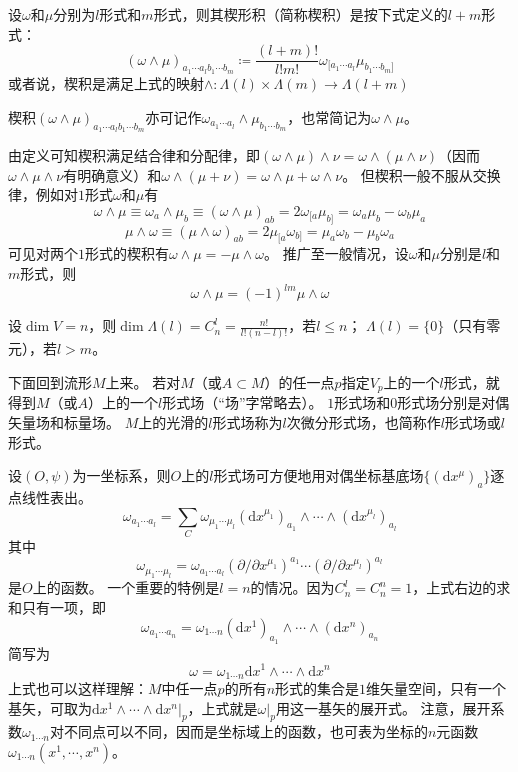\begin{definition}
    设$\omega$和$\mu$分别为$l$形式和$m$形式，则其楔形积（简称楔积）是按下式定义的$l + m$形式：
    $$(\omega \wedge \mu)_{a_1 \cdots a_l b_1 \cdots b_m} \coloneq \frac{(l+m)!}{l!m!}\omega_{[a_1 \cdots a_l}\mu_{b_1 \cdots b_m]}$$
    或者说，楔积是满足上式的映射$\wedge \colon \Lambda(l) \times \Lambda(m) \to \Lambda(l + m)$
\end{definition}

楔积$(\omega \wedge \mu)_{a_1 \cdots a_l b_1 \cdots b_m}$亦可记作$\omega_{a_1 \cdots a_l} \wedge \mu_{b_1 \cdots b_m}$，也常简记为$\omega \wedge \mu$。

由定义可知楔积满足结合律和分配律，即$(\omega \wedge \mu) \wedge \nu = \omega \wedge (\mu \wedge \nu)$（因而$\omega \wedge \mu \wedge \nu$有明确意义）和$\omega \wedge (\mu + \nu) = \omega \wedge \mu + \omega \wedge \nu$。
但楔积一般不服从交换律，例如对$1$形式$\omega$和$\mu$有
$$\omega \wedge \mu \equiv \omega_a \wedge \mu_b \equiv (\omega \wedge \mu)_{ab} = 2\omega_{[a}\mu_{b]} = \omega_a\mu_b - \omega_b\mu_a$$
$$\mu \wedge \omega \equiv (\mu \wedge \omega)_{ab} = 2\mu_{[a}\omega_{b]} = \mu_a\omega_b - \mu_b\omega_a$$
可见对两个$1$形式的楔积有$\omega \wedge \mu = - \mu \wedge \omega$。
推广至一般情况，设$\omega$和$\mu$分别是$l$和$m$形式，则
$$\omega \wedge \mu = (-1)^{lm} \mu \wedge \omega$$

\begin{theorem}
    设$\dim V = n$，则$\dim \Lambda(l) = C_n^l = \frac{n!}{l!(n - l)!}$，若$l \leq n$；
    $\Lambda(l) = \{0\}$（只有零元），若$l > m$。
\end{theorem}

下面回到流形$M$上来。
若对$M$（或$A \subset M$）的任一点$p$指定$V_p$上的一个$l$形式，就得到$M$（或$A$）上的一个$l$形式场（``场''字常略去）。
$1$形式场和$0$形式场分别是对偶矢量场和标量场。
$M$上的光滑的$l$形式场称为$l$次微分形式场，也简称作$l$形式场或$l$形式。

设$(O, \psi)$为一坐标系，则$O$上的$l$形式场可方便地用对偶坐标基底场$\{(\mathrm{d}x^\mu)_a\}$逐点线性表出。
$$\omega_{a_1 \cdots a_l} = \sum_C \omega_{\mu_1 \cdots \mu_l}(\mathrm{d}x^{\mu_1})_{a_1} \wedge \cdots \wedge (\mathrm{d}x^{\mu_l})_{a_l}$$
其中
$$\omega_{\mu_1 \cdots \mu_l} = \omega_{a_1 \cdots a_l}(\partial / \partial x^{\mu_1})^{a_1} \cdots (\partial / \partial x^{\mu_l})^{a_l}$$
是$O$上的函数。
一个重要的特例是$l = n$的情况。因为$C_n^l = C_n^n = 1$，上式右边的求和只有一项，即
$$\omega_{a_1 \cdots a_n} = \omega_{1 \cdots n}(\mathrm{d}x^{1})_{a_1} \wedge \cdots \wedge (\mathrm{d}x^{n})_{a_n}$$
简写为
$$\omega = \omega_{1 \cdots n}\mathrm{d}x^{1} \wedge \cdots \wedge \mathrm{d}x^{n}$$
上式也可以这样理解：$M$中任一点$p$的所有$n$形式的集合是$1$维矢量空间，只有一个基矢，可取为$\mathrm{d}x^{1} \wedge \cdots \wedge \mathrm{d}x^{n}|_p$，上式就是$\omega|_p$用这一基矢的展开式。
注意，展开系数$\omega_{1 \cdots n}$对不同点可以不同，因而是坐标域上的函数，也可表为坐标的$n$元函数$\omega_{1 \cdots n}(x^1, \cdots, x^n)$。

